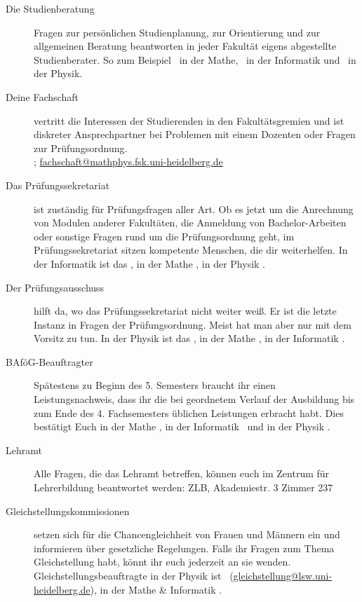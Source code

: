 \begin{description}
\item[Die Studienberatung] Fragen zur persönlichen Studienplanung, zur
	Orientierung und zur allgemeinen Beratung beantworten in jeder Fakultät
	eigens abgestellte Studienberater. So zum Beispiel \studienberatungmathe\
	in der Mathe, \studienberatunginformatik\ in der Informatik und
	\studienberatungphysik\ in der Physik.

\item[Deine Fachschaft] vertritt die Interessen der Studierenden in den
	Fakultätsgremien und ist diskreter Ansprechpartner bei Problemen mit einem
	Dozenten oder Fragen zur Prüfungsordnung. \\\fsraum;
	\url{fachschaft@mathphys.fsk.uni-heidelberg.de}

\item[Das Prüfungssekretariat] ist zuständig für Prüfungsfragen aller Art. Ob
	es jetzt um die Anrechnung von Modulen anderer Fakultäten, die Anmeldung
	von Bachelor-Arbeiten oder sonstige Fragen rund um die Prüfungsordnung
	geht, im Prüfungssekretariat sitzen kompetente Menschen, die dir
	weiterhelfen. In der Informatik ist das \pruefsekinfo, in der Mathe
	\pruefsekmathe, in der Physik \pruefsekphysik.

\item[Der Prüfungsausschuss] hilft da, wo das Prüfungssekretariat nicht weiter
	weiß. Er ist die letzte Instanz in Fragen der Prüfungsordnung. Meist hat
	man aber nur mit dem Vorsitz zu tun. In der Physik ist das
	\pruefausschussvorsitzphysik, in der Mathe \pruefausschussvorsitzmathe, in
	der Informatik \pruefausschussvorsitzinformatik.

\item[BAföG-Beauftragter] Spätestens zu Beginn des 5. Semesters braucht ihr
	einen Leistungsnachweis, dass ihr die bei geordnetem Verlauf der Ausbildung
	bis zum Ende des 4. Fachsemesters üblichen Leistungen erbracht habt. Dies
	bestätigt Euch in der Mathe \bafogmathe , in der Informatik
	\bafoginformatik\ und in der Physik \bafogphysik .

\item[Lehramt] Alle Fragen, die das Lehramt betreffen, können euch im Zentrum
	für Lehrerbildung beantwortet werden: ZLB, Akademiestr. 3 Zimmer 237

\item[Gleichstellungskommissionen] setzen sich für die Chancengleichheit von
	Frauen und Männern ein und informieren über gesetzliche Regelungen. Falls
	ihr Fragen zum Thema Gleichstellung habt, könnt ihr euch jederzeit an sie
	wenden. Gleichstellungsbeauftragte in der Physik ist
	\frauenbeauftragtephysik\ (\url{gleichstellung@lsw.uni-heidelberg.de}), in
	der Mathe \& Informatik \frauenbeauftragtemathe .


\end{description}


